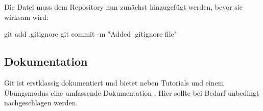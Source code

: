 \documentclass[parskip=half, final]{scrreprt}
\begin{document}
Die  Datei muss dem Repository nun zunächst hinzugefügt werden, bevor sie wirksam wird:

\begin{shlst}
git add .gitignore
git commit -m "Added .gitignore file"
\end{shlst}

\subsection{Dokumentation}\label{sec:git_doku}

Git  ist erstklassig dokumentiert und bietet neben Tutorials und einem Übungsmodus  eine umfassende Dokumentation . Hier sollte bei Bedarf unbedingt nachgeschlagen werden.
\end{document}
